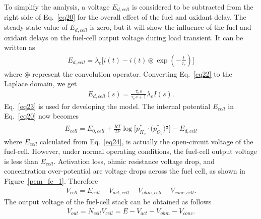 \documentclass[11pt,a4paper]{article}
\numberwithin{equation}{section}
\theoremstyle{it}
\theoremstyle{definition}
\begin{document}
To simplify the analysis, a voltage $E_{d,cell}$ is considered to be subtracted  from the right side of Eq.~\eqref{eq20} for the overall effect of the fuel and oxidant delay. The steady state value of $E_{d,cell}$ is zero, but it will show the influence of the fuel and oxidant delays on the fuel-cell output voltage during load transient. It can be written as
\begin{equation}\label{eq22}
	\begin{aligned}
		E_{d,cell} = \lambda_e \Big[i(t) - i(t)\circledast\exp(-\frac{t}{\tau_e})\Big]
	\end{aligned}
\end{equation}
where $\circledast$ represent the convolution operator. Converting Eq.~\eqref{eq22} to the Laplace domain, we get
\begin{equation}\label{eq23}
	\begin{aligned}
		E_{d,cell}(s) = \frac{\tau_es}{\tau_es+1} \lambda_eI(s).
	\end{aligned}
\end{equation}
Eq.~\eqref{eq23} is used for developing the model. The internal potential $E_{cell}$ in Eq.~\eqref{eq20} now becomes
\begin{equation}\label{eq24}
	\begin{aligned}
		E_{cell} = E_{0,cell} + \frac{RT}{2F}\log\Bigg[{p_{H_2}^*\cdot\Big(p_{O_2}^*\Big)^{\frac{1}{2}}}\Bigg]-E_{d,cell}
	\end{aligned}
\end{equation}
where $E_{cell}$ calculated from Eq.~\eqref{eq24}, is actually the open-circuit voltage of the fuel-cell. However, under normal operating conditions, the fuel-cell output voltage is less than $E_{cell}$. Activation loss, ohmic resistance voltage drop, and concentration over-potential are voltage drops across the fuel cell, as shown in Figure~\ref{pem_fc_1}. Therefore
\begin{equation}\label{eq25}
	\begin{aligned}
		V_{cell} = E_{cell} - V_{act,cell} - V_{ohm,cell} - V_{conc,cell}.
	\end{aligned}
\end{equation}
The output voltage of the fuel-cell stack can be obtained as follows
\begin{equation}\label{eq26}
	\begin{aligned}
		V_{out} = N_{cell}V_{cell} = E - V_{act} - V_{ohm} - V_{conc}.
	\end{aligned}
\end{equation}
\end{document}
